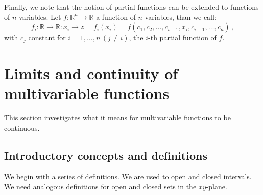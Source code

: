 \ifanalysis
Finally, we note that the notion of partial functions can be extended to functions of $n$ variables. Let $f:\mathbb{R}^n\to\mathbb{R}$ a function of $n$ variables, than we call:
    $$
    f_i:\mathbb{R}\to\mathbb{R}: x_i\to z=f_i(x_i)=f(c_1,c_2,\ldots,c_{i-1},x_i,c_{i+1},\ldots,c_n)\,,
    $$
    with $c_j$ constant for $i=1,\ldots,n\, (j\neq i)$, the $i$-th partial function of $f$.
\fi

\section{Limits and continuity of multivariable functions}\label{sec:multi_limit}
This section investigates what it means for multivariable functions to be continuous.
\subsection{Introductory concepts and definitions}





\ifcalculus
We begin with a series of definitions. We are used to open  and closed intervals. We need analogous definitions for open and closed sets in the $xy$-plane.

